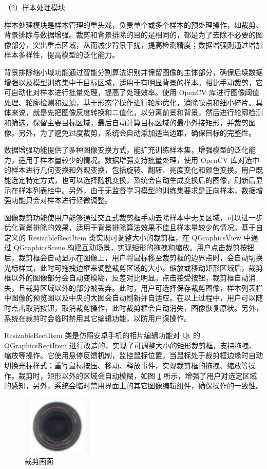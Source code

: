 \documentclass[
  ]{njuthesis}
\begin{document}
（2）样本处理模块

样本处理模块是样本管理的重头戏，负责单个或多个样本的预处理操作，如裁剪、背景排除与数据增强。裁剪和背景排除的目的是相同的，都是为了去除不必要的图像部分，突出重点区域，从而减少背景干扰，提高检测精度；数据增强则通过增加样本多样性，提高模型的泛化能力。

背景排除缩小域功能通过智能分割算法识别并保留图像的主体部分，确保后续数据增强以及模型训练集中于目标区域，适用于有明显背景的样本。相比手动裁剪，它可自动化对样本进行批量处理，提高了处理效率。使用 OpenCV 库进行图像阈值处理、轮廓检测和过滤，基于形态学操作进行轮廓优化，消除噪点和细小碎片。具体来说，就是先把图像灰度转换和二值化，以分离前景和背景，然后进行轮廓检测和筛选，保留主要目标区域，最后自动计算目标区域的最小外接矩形，并裁剪图像。另外，为了避免过度裁剪，系统会自动添加适当边距，确保目标的完整性。

数据增强功能提供了多种图像变换方式，能扩充训练样本集，增强模型的泛化能力，适用于样本量较少的情况。数据增强支持批量处理，使用 OpenCV 库对选中的样本进行几何变换和外观变换，包括旋转、翻转、亮度变化和颜色变换。用户既能选定特定方式，也可以选择随机变换，系统会自动生成变换后的图像，刷新后显示在样本列表栏中。另外，由于无监督学习模型的训练集要求是正向样本，数据增强功能只会对样本进行轻微调整。

图像裁剪功能使用户能够通过交互式裁剪框手动去除样本中无关区域，可以进一步优化背景排除的效果，适用于背景排除算法效果不佳且样本量较少的情况。基于自定义的 ResizableRectItem 类实现可调整大小的裁剪框，在 QGraphicsView 中通过 QGraphicsScene 构建互动场景，实现矩形的拖拽和缩放。用户点击裁剪按钮后，裁剪框会自动显示在图像上，用户将鼠标移至裁剪框的边界点时，会自动切换光标样式，此时可拖拽边框来调整裁剪区域的大小。缩放或移动矩形区域后，裁剪框以外的图像部分会自动变模糊，反差对比明显。点击接受按钮，裁剪框自动消失，且裁剪区域以外的部分被丢弃。此时，用户可选择保存裁剪图像，样本列表栏中图像的预览图以及中央的大图会自动刷新并自适应。在以上过程中，用户可以随时点击取消按钮，取消裁剪操作，此时裁剪框会自动消失，图像恢复原状。另外，系统在裁剪时会临时禁用其它编辑功能，以防用户误操作。

ResizableRectItem 类是仿照安卓手机的相片编辑功能对 Qt 的 QGraphicsRectItem 进行改造的，实现了可调整大小的矩形裁剪框，支持拖拽、缩放等操作。它使用悬停反馈机制，监控鼠标位置，当鼠标处于裁剪框边缘时自动切换光标样式；重写鼠标按压、移动、释放事件，实现裁剪框的拖拽、缩放等操作。裁剪时，矩形以外的区域会自动模糊，如图 \ref{裁剪画面} 所示，增强了用户对选定区域的感知，另外，系统会临时禁用界面上的其它图像编辑组件，确保操作的一致性。

\begin{figure}[htb]
    \centering
    \includegraphics[width=0.3\textwidth]{images/裁剪画面.png}
    \caption{裁剪画面}
    \label{裁剪画面}
\end{figure}
\end{document}
